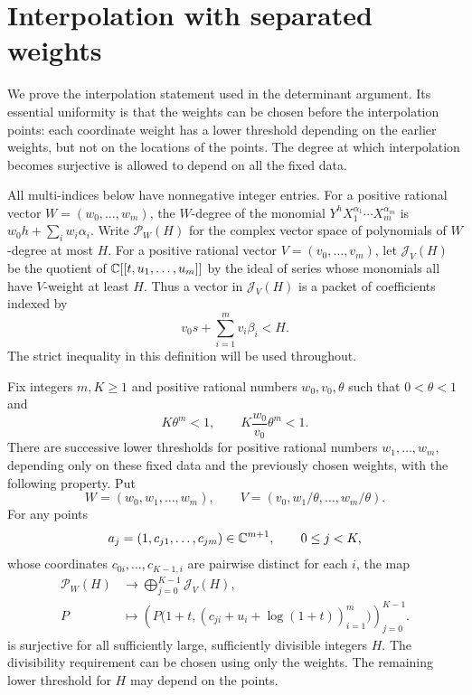 \section{Interpolation with separated weights}
\label{geom:section}

We prove the interpolation statement used in the determinant argument. Its
essential uniformity is that the weights can be chosen before the interpolation
points: each coordinate weight has a lower threshold depending on the earlier
weights, but not on the locations of the points. The degree at which
interpolation becomes surjective is allowed to depend on all the fixed data.

All multi-indices below have nonnegative integer entries. For a positive
rational vector $W=(w_0,\ldots,w_m)$, the $W$-degree of the
monomial $Y^hX_1^{\alpha_1}\cdots X_m^{\alpha_m}$ is
$w_0h+\sum_iw_i\alpha_i$. Write $\mathcal P_W(H)$ for the complex vector
space of polynomials of $W$-degree at most $H$. For a positive rational vector
$V=(v_0,\ldots,v_m)$, let $\mathcal J_V(H)$ be the quotient of
$\mathbb C[[t,u_1,\ldots,u_m]]$ by the ideal of series whose monomials all have
$V$-weight at least $H$. Thus a vector in $\mathcal J_V(H)$ is a packet of
coefficients indexed by
\[
 v_0s+\sum_{i=1}^m v_i\beta_i<H.
\]
The strict inequality in this definition will be used throughout.

\begin{theorem}
\label{geom:interpolation}
Fix integers $m,K\ge1$ and positive rational numbers $w_0,v_0,\theta$ such
that $0<\theta<1$ and
\begin{equation}
\label{geom:volume-hypotheses}
 K\theta^m<1,
 \qquad K\frac{w_0}{v_0}\theta^m<1.
\end{equation}
There are successive lower thresholds for positive rational numbers
$w_1,\ldots,w_m$, depending only on these fixed data and the previously
chosen weights, with the following property. Put
\[
 W=(w_0,w_1,\ldots,w_m),\qquad
 V=(v_0,w_1/\theta,\ldots,w_m/\theta).
\]
For any points
\[
 a_j=(1,c_{j1},\ldots,c_{jm})\in\mathbb C^{m+1},\qquad 0\le j<K,
\]
whose coordinates $c_{0i},\ldots,c_{K-1,i}$ are pairwise distinct for each
$i$, the map
\begin{equation}
\label{geom:jet-map}
 \begin{aligned}
 \mathcal P_W(H)&\longrightarrow\bigoplus_{j=0}^{K-1}\mathcal J_V(H),\\
 P&\longmapsto
 \left(P\bigl(1+t,(c_{ji}+u_i+\log(1+t))_{i=1}^m\bigr)\right)_{j=0}^{K-1}.
 \end{aligned}
\end{equation}
is surjective for all sufficiently large, sufficiently divisible integers $H$.
The divisibility requirement can be chosen using only the weights. The
remaining lower threshold for $H$ may depend on the points.
\end{theorem}

